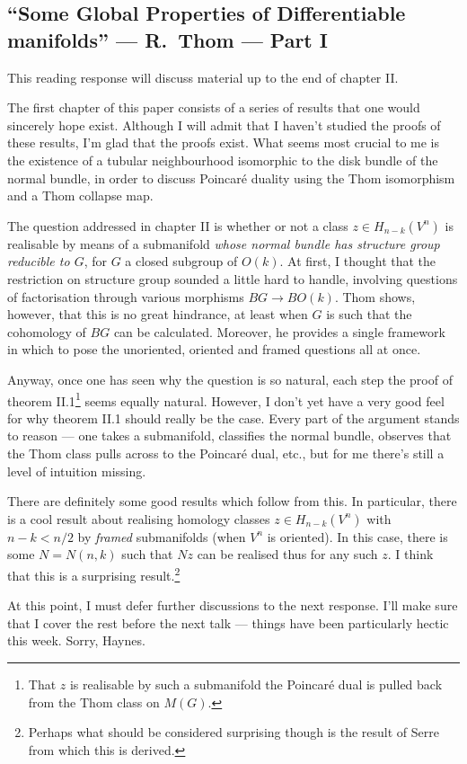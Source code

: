 \documentclass[11pt]{article}
\newcommand{\KanSemResponse}[1]
{
\thispagestyle{fancy}
\section{#1}
}
\begin{document}
\begin{ThomGlobalPropertiesPartOne}
\KanSemResponse
{``Some Global Properties of Differentiable manifolds'' --- R.\ Thom --- Part I}
This reading response will discuss material up to the end of chapter II.

The first chapter of this paper consists of a series of results that one would sincerely hope exist. Although I will admit that I haven't studied the proofs of these results, I'm glad that the proofs exist. What seems most crucial to me is the existence of a tubular neighbourhood isomorphic to the disk bundle of the normal bundle, in order to discuss Poincar\'e duality using the Thom isomorphism and a Thom collapse map.

The question addressed in chapter II is whether or not a class $z\in H_{n-k}(V^n)$ is realisable by means of a submanifold \emph{whose normal bundle has structure group reducible to $G$}, for $G$ a closed subgroup of $O(k)$. At first, I thought that the restriction on structure group sounded a little hard to handle, involving questions of factorisation through various morphisms $BG\to BO(k)$. Thom shows, however, that this is no great hindrance, at least when $G$ is such that the cohomology of $BG$ can be calculated.
Moreover, he provides a single framework in which to pose the unoriented, oriented and framed questions all at once.

Anyway, once one has seen why the question is so natural, each step the proof of theorem II.1\footnote{That $z$ is realisable by such a submanifold \Iff the Poincar\'e dual is pulled back from the Thom class on $M(G)$.} seems equally natural. However, I don't yet have a very good feel for why theorem II.1 should really be the case. Every part of the argument stands to reason --- one takes a submanifold, classifies the normal bundle, observes that the Thom class pulls across to the Poincar\'e dual, etc., but for me there's still a level of intuition missing.

There are definitely some good results which follow from this. In particular, there is a cool result about realising homology classes $z\in H_{n-k}(V^n)$ with $n-k<n/2$ by \emph{framed} submanifolds (when $V^n$ is oriented). In this case, there is some $N=N(n,k)$ such that $Nz$ can be realised thus for any such $z$. I think that this is a surprising result.\footnote{Perhaps what should be considered surprising though is the result of Serre from which this is derived.}

At this point, I must defer further discussions to the next response. I'll make sure that I cover the rest before the next talk --- things have been particularly hectic this week. Sorry, Haynes.

\pagebreak
\end{ThomGlobalPropertiesPartOne}
\end{document}
